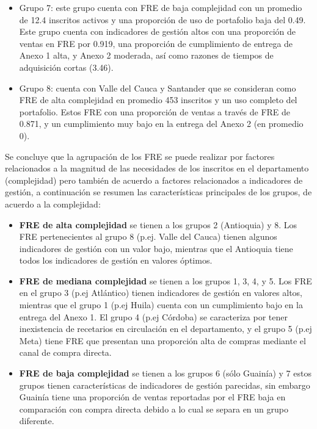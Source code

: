 \documentclass[
  oneside]{book}
\begin{document}
\begin{itemize}
\item
  Grupo 7: este grupo cuenta con FRE de baja complejidad con un promedio de 12.4 inscritos activos y una proporción de uso de portafolio baja del 0.49. Este grupo cuenta con indicadores de gestión altos con una proporción de ventas en FRE por 0.919, una proporción de cumplimiento de entrega de Anexo 1 alta, y Anexo 2 moderada, así como razones de tiempos de adquisición cortas (3.46).
\item
  Grupo 8: cuenta con Valle del Cauca y Santander que se consideran como FRE de alta complejidad en promedio 453 inscritos y un uso completo del portafolio. Estos FRE con una proporción de ventas a través de FRE de 0.871, y un cumplimiento muy bajo en la entrega del Anexo 2 (en promedio 0).
\end{itemize}

Se concluye que la agrupación de los FRE se puede realizar por factores relacionados a la magnitud de las necesidades de los inscritos en el departamento (complejidad) pero también de acuerdo a factores relacionados a indicadores de gestión, a continuación se resumen las características principales de los grupos, de acuerdo a la complejidad:

\begin{itemize}
\item
  \textbf{FRE de alta complejidad} se tienen a los grupos 2 (Antioquia) y 8. Los FRE pertenecientes al grupo 8 (p.ej. Valle del Cauca) tienen algunos indicadores de gestión con un valor bajo, mientras que el Antioquia tiene todos los indicadores de gestión en valores óptimos.
\item
  \textbf{FRE de mediana complejidad} se tienen a los grupos 1, 3, 4, y 5. Los FRE en el grupo 3 (p.ej Atlántico) tienen indicadores de gestión en valores altos, mientras que el grupo 1 (p.ej Huila) cuenta con un cumplimiento bajo en la entrega del Anexo 1. El grupo 4 (p.ej Córdoba) se caracteriza por tener inexistencia de recetarios en circulación en el departamento, y el grupo 5 (p.ej Meta) tiene FRE que presentan una proporción alta de compras mediante el canal de compra directa.
\item
  \textbf{FRE de baja complejidad} se tienen a los grupos 6 (sólo Guainía) y 7 estos grupos tienen características de indicadores de gestión parecidas, sin embargo Guainía tiene una proporción de ventas reportadas por el FRE baja en comparación con compra directa debido a lo cual se separa en un grupo diferente.
\end{itemize}
\end{document}
